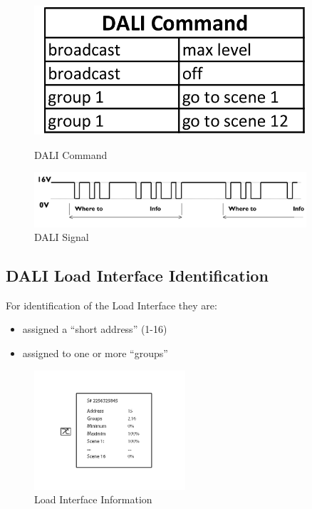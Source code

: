 \documentclass{article}
\begin{document}
\begin{figure}[h]
\centering
\begin{minipage}[b]{0.45\linewidth}
\includegraphics[width= 0.9\textwidth]{images/dalicommand.jpg}
\caption{DALI Command}
\end{minipage}
\quad
\begin{minipage}[b]{0.45\linewidth}
\includegraphics[width = 0.9\textwidth]{images/signal.jpg}
\caption{DALI Signal}
\label{fig:minipage2}
\end{minipage}
\end{figure}


\subsection{DALI Load Interface Identification}
For identification of the Load Interface they are:
\begin{itemize}
\item assigned a ``short address'' (1-16)
\item assigned to one or more ``groups''
\end{itemize}

\begin{figure}[h]
\centering
\includegraphics[width = 0.5\textwidth]{images/loadinterfaceinformation.png}
\caption{Load Interface Information}
\end{figure}
\end{document}
